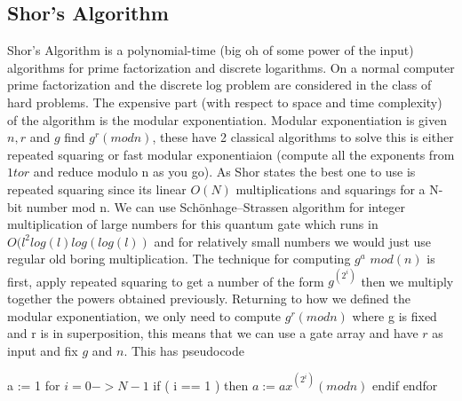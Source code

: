 \documentclass{article}
\begin{document}
\subsection{Shor's Algorithm}
Shor's Algorithm is a polynomial-time (big oh of some power of the input) algorithms for prime factorization and discrete logarithms. On a normal computer prime factorization and the discrete log problem are considered in the class of hard problems. The expensive part (with respect to space and time complexity) of the algorithm is the modular exponentiation. Modular exponentiation is given $n,r$ and $g $ find $g^r (mod n)$, these have 2 classical algorithms to solve this is either repeated squaring or fast modular exponentiaion (compute all the exponents from $1 to r$ and reduce modulo n as you go). As Shor states\cite{Shor1995} the best one to use is repeated squaring since its linear $O(N)$ multiplications and squarings for a N-bit number mod n. We can use Schönhage–Strassen algorithm for integer multiplication  of large numbers for this quantum gate which runs in $O(l^2log(l)log(log(l))$ and for relatively small numbers we would just use regular old boring multiplication. The technique for computing $g^a$ $mod(n)$ is first, apply repeated squaring to get a number of the form $g^(2^i)$ then we multiply together the powers obtained previously. Returning to how we defined the modular exponentiation, we only need to compute $g^r (mod n)$ where g is fixed and r is in superposition, this means that we can use a gate array and have $r$ as input and fix $g$ and $n$. This has pseudocode
\begin{algorithm}
a := 1 \newline
for $i = 0 -> N-1$ \newline
if (  i == 1 ) then \newline
$a := ax^(2^i) (mod n)$ \newline
endif \newline
endfor \newline
\end{algorithm}      
\end{document}
